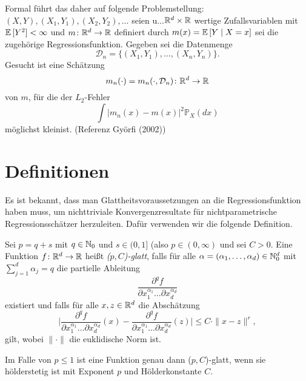 Formal führt das daher auf folgende Problemstellung:
$(X, Y), (X_1, Y_1), (X_2, Y_2), \dots$ seien u.\@i.\@v.\@ $\mathbb{R}^d \times \mathbb{R}$ wertige Zufallsvariablen mit $\mathbb{E}\,[Y^2] < \infty$ und $m\colon\mathbb{R}^d \to \mathbb{R}$ definiert durch $m(x) = \mathbb{E}\,[Y \mid X = x]$ sei die zugehörige Regressionsfunktion. Gegeben sei die Datenmenge 
$$ \mathcal{D}_n = \{(X_1, Y_1),\dots,(X_n, Y_n)\}.$$
Gesucht ist eine Schätzung 
$$m_n(\cdot) = m_n(\cdot, \mathcal{D}_n)\colon\mathbb{R}^d \to \mathbb{R} $$
von $m$, für die der $L_2$-Fehler 
$$\int |m_n(x) - m(x)|^2 \mathds{P}_X(dx)$$
möglichst \glqq klein\grqq\@ ist. (Referenz Györfi (2002))

\section{Definitionen}
Es ist bekannt, dass man Glattheitsvoraussetzungen an die Regressionsfunktion haben muss, um nichttriviale Konvergenzresultate für nichtparametrische Regressionsschätzer herzuleiten. Dafür verwenden wir die folgende Definition.
\begin{defn}[($p,C$)-Glattheit]
\label{def:pc}
   Sei $p = q + s$ mit $q \in \mathbb{N}_0$ und $s \in (0,1]$ (also $p \in (0, \infty)$ und sei $C > 0$. Eine Funktion $f\colon \mathbb{R}^d \to \mathbb{R}$ heißt \emph{($p, C$)-glatt}, falls für alle $\alpha = (\alpha_1,\dots,\alpha_d) \in \mathbb{N}_0^d$ mit $\sum_{j = 1}^{d}\alpha_j = q$ die partielle Ableitung 
   $$ \frac{\partial^qf}{\partial x_1^{\alpha_1}\dots\partial x_d^{\alpha_d}}$$
   existiert und falls für alle $x, z \in \mathbb{R}^d$ die Abschätzung 
   $$ \bigg|\frac{\partial^qf}{\partial x_1^{\alpha_1}\dots\partial x_d^{\alpha_d}}(x) - \frac{\partial^qf}{\partial x_1^{\alpha_1}\dots\partial x_d^{\alpha_d}}(z) \bigg| \leq C \cdot \|x - z\|^r,$$
   gilt, wobei $\|\cdot\|$ die euklidische Norm ist.  
\end{defn}
\begin{bemnumber}
Im Falle von $p \leq 1$ ist eine Funktion genau dann ($p, C$)-glatt, wenn sie hölderstetig ist mit Exponent $p$ und Hölderkonstante $C$.
\end{bemnumber}

